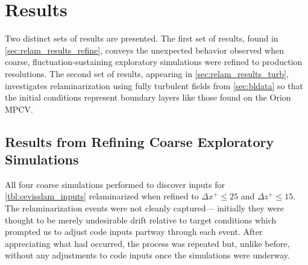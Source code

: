 %
%

\section{Results}
\label{sec:relam_results}

Two distinct sets of results are presented.
%
The first set of results, found in \autoref{sec:relam_results_refine}, conveys
the unexpected behavior observed when coarse, fluctuation-sustaining exploratory
simulations were refined to production resolutions.
%
The second set of results, appearing in \autoref{sec:relam_results_turb},
investigates relaminarization using fully turbulent fields from
\autoref{sec:bldata} so that the initial conditions represent boundary layers
like those found on the Orion MPCV.


\subsection{Results from Refining Coarse Exploratory Simulations}
\label{sec:relam_results_refine}

All four coarse simulations performed to discover inputs for
\autoref{tbl:cevisslam_inputs} relaminarized when refined to
$\Delta{}x^{+}\leq{}25$ and $\Delta{}z^{+}\leq{}15$.  The relaminarization
events were not cleanly captured--- initially they were thought to be merely
undesirable drift relative to target conditions which prompted us to adjust code
inputs partway through each event.  After appreciating what had occurred, the
process was repeated but, unlike before, without any adjustments to code inputs
once the simulations were underway.

